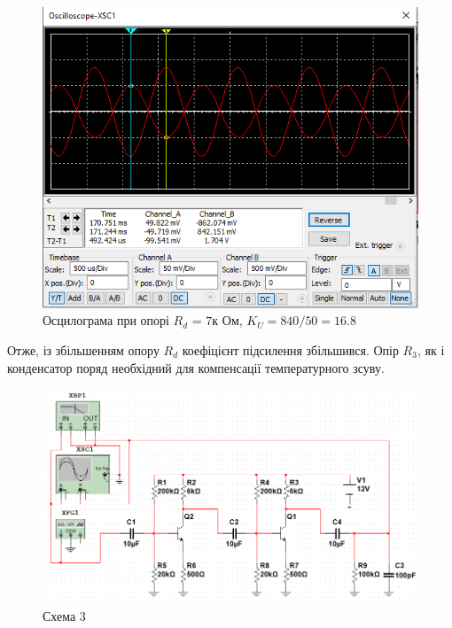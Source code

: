 \documentclass{article}
\begin{document}
\begin{normalsize}
	\begin{figure}[H]
		\centering
		\includegraphics[width=\textwidth]{22}
		\caption{Осцилограма при опорі $R_d$ = $7$к Ом, $K_U = 840/50= 16.8$}
	\end{figure}
	
	Отже, із збільшенням опору $R_d$ коефіцієнт підсилення збільшився.	Опір $R_3$, як і конденсатор поряд необхідний для компенсації температурного зсуву.
	
	\begin{figure}[H]
		\centering
		\includegraphics[width=\textwidth]{3}
		\caption{Схема 3}
	\end{figure}
	

\end{normalsize}
\end{document}
